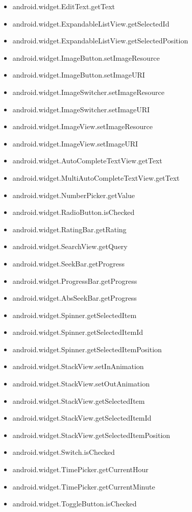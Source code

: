 \documentclass{sig-alternate}
\begin{document}
\begin{itemize}
\item android.widget.EditText.getText
\item android.widget.ExpandableListView.getSelectedId
\item android.widget.ExpandableListView.getSelectedPosition
\item android.widget.ImageButton.setImageResource
\item android.widget.ImageButton.setImageURI
\item android.widget.ImageSwitcher.setImageResource
\item android.widget.ImageSwitcher.setImageURI
\item android.widget.ImageView.setImageResource
\item android.widget.ImageView.setImageURI
\item android.widget.AutoCompleteTextView.getText
\item android.widget.MultiAutoCompleteTextView.getText
\item android.widget.NumberPicker.getValue
\item android.widget.RadioButton.isChecked
\item android.widget.RatingBar.getRating
\item android.widget.SearchView.getQuery
\item android.widget.SeekBar.getProgress
\item android.widget.ProgressBar.getProgress
\item android.widget.AbsSeekBar.getProgress
\item android.widget.Spinner.getSelectedItem
\item android.widget.Spinner.getSelectedItemId
\item android.widget.Spinner.getSelectedItemPosition
\item android.widget.StackView.setInAnimation
\item android.widget.StackView.setOutAnimation
\item android.widget.StackView.getSelectedItem
\item android.widget.StackView.getSelectedItemId
\item android.widget.StackView.getSelectedItemPosition
\item android.widget.Switch.isChecked
\item android.widget.TimePicker.getCurrentHour
\item android.widget.TimePicker.getCurrentMinute
\item android.widget.ToggleButton.isChecked

\end{itemize}
\end{document}
